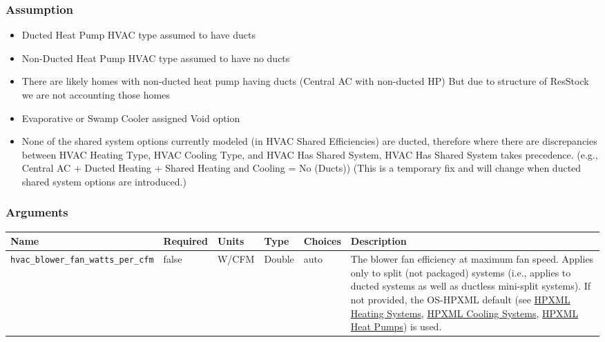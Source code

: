 \subsubsection{Assumption}\label{assumption-39}

\begin{itemize}
 
\item
  Ducted Heat Pump HVAC type assumed to have ducts
\item
  Non-Ducted Heat Pump HVAC type assumed to have no ducts
\item
  There are likely homes with non-ducted heat pump having ducts (Central
  AC with non-ducted HP) But due to structure of ResStock we are not
  accounting those homes
\item
  Evaporative or Swamp Cooler assigned Void option
\item
  None of the shared system options currently modeled (in HVAC Shared
  Efficiencies) are ducted, therefore where there are discrepancies
  between HVAC Heating Type, HVAC Cooling Type, and HVAC Has Shared
  System, HVAC Has Shared System takes precedence. (e.g., Central AC +
  Ducted Heating + Shared Heating and Cooling = No (Ducts)) (This is a
  temporary fix and will change when ducted shared system options are
  introduced.)
\end{itemize}

\subsubsection{Arguments}\label{arguments-43}

\begin{longtable}[]{@{}llllll@{}}
\toprule\noalign{}
Name & Required & Units & Type & Choices & Description \\
\midrule\noalign{}
\endhead
\bottomrule\noalign{}
\endlastfoot
\texttt{hvac\_blower\_fan\_watts\_per\_cfm} & false & W/CFM & Double &
auto & The blower fan efficiency at maximum fan speed. Applies only to
split (not packaged) systems (i.e., applies to ducted systems as well as
ductless mini-split systems). If not provided, the OS-HPXML default (see
\href{https://openstudio-hpxml.readthedocs.io/en/v1.7.0/workflow_inputs.html\#hpxml-heating-systems}{HPXML
Heating Systems},
\href{https://openstudio-hpxml.readthedocs.io/en/v1.7.0/workflow_inputs.html\#hpxml-cooling-systems}{HPXML
Cooling Systems},
\href{https://openstudio-hpxml.readthedocs.io/en/v1.7.0/workflow_inputs.html\#hpxml-heat-pumps}{HPXML
Heat Pumps}) is used. \\
\end{longtable}

